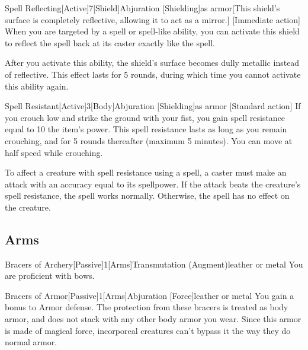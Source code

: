        \begin{magicitemdef}{Spell Reflecting}[Active]{7}[Shield]{Abjuration [Shielding]}{as armor}[This shield's surface is completely reflective, allowing it to act as a mirror.]
            [Immediate action] When you are targeted by a spell or spell-like ability, you can activate this shield to reflect the spell back at its caster exactly like the  spell.

            After you activate this ability, the shield's surface becomes dully metallic instead of reflective.
            This effect lasts for 5 rounds, during which time you cannot activate this ability again.
        \end{magicitemdef}

        \begin{magicitemdef}{Spell Resistant}[Active]{3}[Body]{Abjuration [Shielding]}{as armor}
            [Standard action] If you crouch low and strike the ground with your fist, you gain spell resistance equal to 10 \add the item's power.
            This spell resistance lasts as long as you remain crouching, and for 5 rounds thereafter (maximum 5 minutes).
            You can move at half speed while crouching.

            To affect a creature with spell resistance using a spell, a caster must make an attack with an accuracy equal to its spellpower.
            If the attack beats the creature's spell resistance, the spell works normally.
            Otherwise, the spell has no effect on the creature.
        \end{magicitemdef}

    \subsection{Arms}

        \begin{magicitemdef}{Bracers of Archery}[Passive]{1}[Arms]{Transmutation (Augment)}{leather or metal}
             You are proficient with bows.
        \end{magicitemdef}

        \begin{magicitemdef}{Bracers of Armor}[Passive]{1}[Arms]{Abjuration [Force]}{leather or metal}
             You gain a  bonus to Armor defense.
            The protection from these bracers is treated as body armor, and does not stack with any other body armor you wear.
            Since this armor is made of magical force, incorporeal creatures can't bypass it the way they do normal armor.
        \end{magicitemdef}

